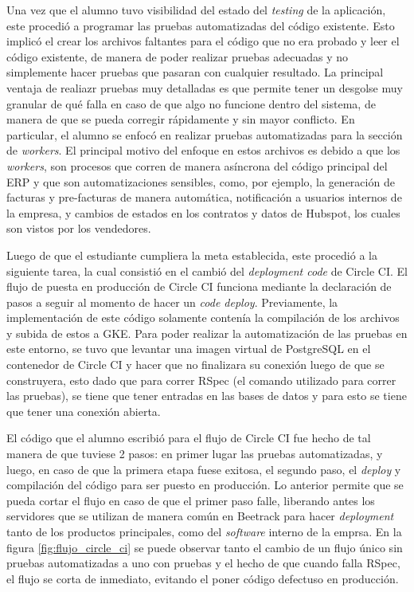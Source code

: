   Una vez que el alumno tuvo visibilidad del estado del \textit{testing} de la aplicación, este procedió a programar las pruebas automatizadas del código existente. Esto implicó el crear los archivos faltantes para el código que no era probado y leer el código existente, de manera de poder realizar pruebas adecuadas y no simplemente hacer pruebas que pasaran con cualquier resultado. La principal ventaja de realiazr pruebas muy detalladas es que permite tener un desgolse muy granular de qué falla en caso de que algo no funcione dentro del sistema, de manera de que se pueda corregir rápidamente y sin mayor conflicto. En particular, el alumno se enfocó en realizar pruebas automatizadas para la sección de \textit{workers}. El principal motivo del enfoque en estos archivos es debido a que los \textit{workers}, son procesos que corren de manera asíncrona del código principal del ERP y que son automatizaciones sensibles, como, por ejemplo, la generación de facturas y pre-facturas de manera automática, notificación a usuarios internos de la empresa, y cambios de estados en los contratos y datos de Hubspot, los cuales son vistos por los vendedores.

  Luego de que el estudiante cumpliera la meta establecida, este procedió a la siguiente tarea, la cual consistió en el cambió del \textit{deployment code} de Circle CI. El flujo de puesta en producción de Circle CI funciona mediante la declaración de pasos a seguir al momento de hacer un \textit{code deploy}. Previamente, la implementación de este código solamente contenía la compilación de los archivos y subida de estos a GKE. Para poder realizar la automatización de las pruebas en este entorno, se tuvo que levantar una imagen virtual de PostgreSQL en el contenedor de Circle CI y hacer que no finalizara su conexión luego de que se construyera, esto dado que para correr RSpec (el comando utilizado para correr las pruebas), se tiene que tener entradas en las bases de datos y para esto se tiene que tener una conexión abierta.

  El código que el alumno escribió para el flujo de Circle CI fue hecho de tal manera de que tuviese 2 pasos: en primer lugar las pruebas automatizadas, y luego, en caso de que la primera etapa fuese exitosa, el segundo paso, el \textit{deploy} y compilación del código para ser puesto en producción. Lo anterior permite que se pueda cortar el flujo en caso de que el primer paso falle, liberando antes los servidores que se utilizan de manera común en Beetrack para hacer \textit{deployment} tanto de los productos principales, como del \textit{software} interno de la emprsa. En la figura \ref{fig:flujo_circle_ci} se puede observar tanto el cambio de un flujo único sin pruebas automatizadas a uno con pruebas y el hecho de que cuando falla RSpec, el flujo se corta de inmediato, evitando el poner código defectuso en producción.

